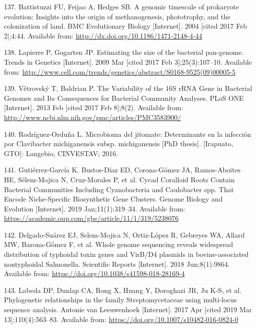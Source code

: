 \documentclass[12pt,twoside]{reedthesis}
\begin{document}
{  \hypertarget{ref-battistuzzi_genomic_2004}{}
  137. Battistuzzi FU, Feijao A, Hedges SB. A genomic timescale of
  prokaryote evolution: Insights into the origin of methanogenesis,
  phototrophy, and the colonization of land. BMC Evolutionary Biology
  {[}Internet{]}. 2004 {[}cited 2017 Feb 2{]};4:44. Available from:
  \url{http://dx.doi.org/10.1186/1471-2148-4-44}
  
  \hypertarget{ref-lapierre_estimating_2009}{}
  138. Lapierre P, Gogarten JP. Estimating the size of the bacterial
  pan-genome. Trends in Genetics {[}Internet{]}. 2009 Mar {[}cited 2017
  Feb 3{]};25(3):107--10. Available from:
  \url{http://www.cell.com/trends/genetics/abstract/S0168-9525(09)00005-5}
  
  \hypertarget{ref-vetrovsky_variability_2013}{}
  139. Větrovský T, Baldrian P. The Variability of the 16S rRNA Gene in
  Bacterial Genomes and Its Consequences for Bacterial Community Analyses.
  PLoS ONE {[}Internet{]}. 2013 Feb {[}cited 2017 Feb 8{]};8(2). Available
  from: \url{http://www.ncbi.nlm.nih.gov/pmc/articles/PMC3583900/}
  
  \hypertarget{ref-rodriguez_tesis_2016}{}
  140. Rodríguez-Orduña L. Microbioma del jitomate: Determinante en la
  infección por Clavibacter michiganensis subsp. michiganensis
  {[}PhD thesis{]}. {[}Irapuato, GTO{]}: Langebio, CINVESTAV; 2016.
  
  \hypertarget{ref-gutierrez-garcia_cycad_2019}{}
  141. Gutiérrez-García K, Bustos-Díaz ED, Corona-Gómez JA, Ramos-Aboites
  HE, Sélem-Mojica N, Cruz-Morales P, et al. Cycad Coralloid Roots Contain
  Bacterial Communities Including Cyanobacteria and Caulobacter spp. That
  Encode Niche-Specific Biosynthetic Gene Clusters. Genome Biology and
  Evolution {[}Internet{]}. 2019 Jan;11(1):319--34. Available from:
  \url{https://academic.oup.com/gbe/article/11/1/319/5238076}
  
  \hypertarget{ref-delgado-suarez_whole_2018}{}
  142. Delgado-Suárez EJ, Selem-Mojica N, Ortiz-López R, Gebreyes WA,
  Allard MW, Barona-Gómez F, et al. Whole genome sequencing reveals
  widespread distribution of typhoidal toxin genes and VirB/D4 plasmids in
  bovine-associated nontyphoidal Salmonella. Scientific Reports
  {[}Internet{]}. 2018 Jun;8(1):9864. Available from:
  \url{https://doi.org/10.1038/s41598-018-28169-4}
  
  \hypertarget{ref-labeda_phylogenetic_2017}{}
  143. Labeda DP, Dunlap CA, Rong X, Huang Y, Doroghazi JR, Ju K-S, et al.
  Phylogenetic relationships in the family Streptomycetaceae using
  multi-locus sequence analysis. Antonie van Leeuwenhoek {[}Internet{]}.
  2017 Apr {[}cited 2019 Mar 13{]};110(4):563--83. Available from:
  \url{https://doi.org/10.1007/s10482-016-0824-0}
  
}
\end{document}
